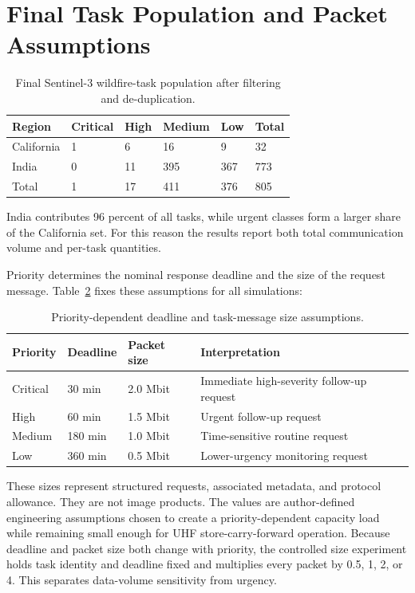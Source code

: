 \section{Final Task Population and Packet Assumptions}
\begin{table}[htbp]\centering\small
\caption{Final Sentinel-3 wildfire-task population after filtering and de-duplication.}
\label{tab:task_population}
\begin{tabularx}{\textwidth}{XXXXXX}
\toprule
\textbf{Region} & \textbf{Critical} & \textbf{High} & \textbf{Medium} & \textbf{Low} & \textbf{Total} \\
\midrule
California & 1 & 6 & 16 & 9 & 32 \\
India & 0 & 11 & 395 & 367 & 773 \\
Total & 1 & 17 & 411 & 376 & 805 \\
\bottomrule
\end{tabularx}
\end{table}
India contributes 96 percent of all tasks, while urgent classes form a larger share of the California set. For this reason the results report both total communication volume and per-task quantities.

Priority determines the nominal response deadline and the size of the request message. Table~\ref{tab:priority_packet} fixes these assumptions for all simulations:

\begin{table}[htbp]\centering\small
\caption{Priority-dependent deadline and task-message size assumptions.}
\label{tab:priority_packet}
\begin{tabularx}{\textwidth}{XXXX}
\toprule
\textbf{Priority} & \textbf{Deadline} & \textbf{Packet size} & \textbf{Interpretation} \\
\midrule
Critical & 30 min & 2.0 Mbit & Immediate high-severity follow-up request \\
High & 60 min & 1.5 Mbit & Urgent follow-up request \\
Medium & 180 min & 1.0 Mbit & Time-sensitive routine request \\
Low & 360 min & 0.5 Mbit & Lower-urgency monitoring request \\
\bottomrule
\end{tabularx}
\end{table}
These sizes represent structured requests, associated metadata, and protocol allowance. They are not image products. The values are author-defined engineering assumptions chosen to create a priority-dependent capacity load while remaining small enough for UHF store-carry-forward operation. Because deadline and packet size both change with priority, the controlled size experiment holds task identity and deadline fixed and multiplies every packet by 0.5, 1, 2, or 4. This separates data-volume sensitivity from urgency.

